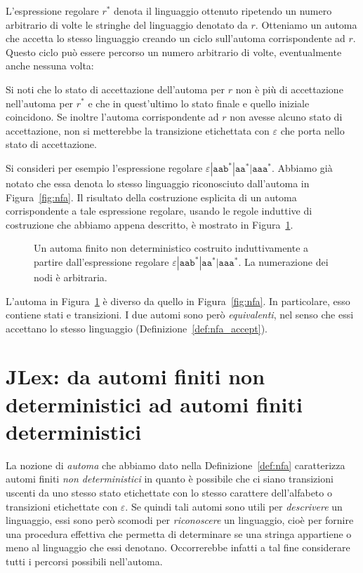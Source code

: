 L'espressione regolare $r^*$ denota il linguaggio ottenuto ripetendo un
numero arbitrario di volte le stringhe del linguaggio denotato da $r$.
Otteniamo un automa che accetta lo stesso linguaggio creando un ciclo
sull'automa corrispondente ad $r$. Questo ciclo pu\`o essere percorso
un numero arbitrario di volte, eventualmente anche nessuna volta:
%
\begin{center}
\end{center}
%
Si noti che lo stato di accettazione dell'automa per $r$ non \`e pi\`u
di accettazione nell'automa per $r^*$ e che in quest'ultimo lo stato
finale e quello iniziale coincidono. Se inoltre l'automa corrispondente
ad $r$ non avesse alcuno stato di accettazione, non si metterebbe la transizione
etichettata con $\varepsilon$ che porta nello stato di accettazione.

Si consideri per esempio l'espressione regolare
$\mathtt{\varepsilon|aab^*|aa^*|aaa^*}$. Abbiamo gi\`a notato
che essa denota lo stesso linguaggio riconosciuto dall'automa
in Figura~\ref{fig:nfa}. Il risultato della costruzione esplicita di un automa
corrispondente a tale espressione regolare, usando le regole induttive di
costruzione che abbiamo appena descritto, \`e mostrato in
Figura~\ref{fig:nfa_built}.
%
\begin{figure}[t]
\begin{center}
\end{center}
\caption{Un automa finito non deterministico costruito induttivamente a partire dall'espressione regolare $\mathtt{\varepsilon|aab^*|aa^*|aaa^*}$. La numerazione dei nodi \`e arbitraria.}\label{fig:nfa_built}
\end{figure}
%
L'automa in Figura~\ref{fig:nfa_built} \`e diverso da quello in
Figura~\ref{fig:nfa}. In particolare, esso contiene \piu stati e transizioni.
I due automi sono per\`o \emph{equivalenti}, nel senso che essi
accettano lo stesso linguaggio (Definizione~\ref{def:nfa_accept}).
%
\section{JLex:
 da automi finiti non deterministici ad automi finiti deterministici}
  \label{sec:dfa}
%
La nozione di \emph{automa} che abbiamo dato nella Definizione~\ref{def:nfa}
caratterizza automi finiti \emph{non deterministici} in quanto \`e
possibile che ci siano \piu transizioni uscenti da uno stesso stato etichettate
con lo stesso carattere dell'alfabeto o transizioni etichettate con
$\varepsilon$. Se quindi tali automi sono utili
per \emph{descrivere} un linguaggio, essi sono per\`o scomodi per
\emph{riconoscere} un linguaggio, cio\`e per fornire una procedura effettiva
che permetta di determinare se una stringa appartiene o meno al linguaggio
che essi denotano. Occorrerebbe infatti a tal fine considerare tutti
i percorsi possibili nell'automa.

